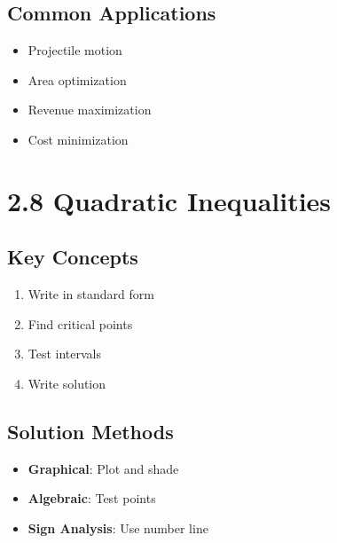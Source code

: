 \documentclass[12pt]{article}
\begin{document}
\subsection*{Common Applications}
\begin{tcolorbox}[colback=lightgray,colframe=secondary,title=Applications]
    \begin{itemize}
        \item Projectile motion
        \item Area optimization
        \item Revenue maximization
        \item Cost minimization
    \end{itemize}
\end{tcolorbox}

\section{2.8 Quadratic Inequalities}
\subsection*{Key Concepts}
\begin{tcolorbox}[colback=lightgray,colframe=primary,title=Solving Steps]
    \begin{enumerate}
        \item Write in standard form
        \item Find critical points
        \item Test intervals
        \item Write solution
    \end{enumerate}
\end{tcolorbox}

\subsection*{Solution Methods}
\begin{tcolorbox}[colback=lightgray,colframe=secondary,title=Methods]
    \begin{itemize}
        \item \textbf{Graphical}: Plot and shade
        \item \textbf{Algebraic}: Test points
        \item \textbf{Sign Analysis}: Use number line
    \end{itemize}
\end{tcolorbox}
\end{document}

